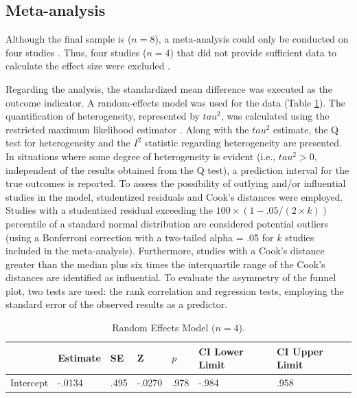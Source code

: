 \documentclass[english]{textolivre}
\begin{document}
\subsection{Meta-analysis}
Although the final sample is ($n = 8$), a meta-analysis could only be conducted on four studies \cite{demirbilek2018, penalba2020, perezsuasnavas2022, salasrueda2019}. Thus, four studies ($n = 4$) that did not provide sufficient data to calculate the effect size were excluded \cite{alexiou2020, almarzouki2022, salasrueda2018, zulkifli2018}.

Regarding the analysis, the standardized mean difference was executed as the outcome indicator. A random-effects model was used for the data (Table \ref{tab-4}). The quantification of heterogeneity, represented by $tau^2$, was calculated using the restricted maximum likelihood estimator \cite{viechtbauer2005}. Along with the $tau^2$ estimate, the Q test for heterogeneity \cite{cochran1954} and the $I^2$ statistic regarding heterogeneity are presented. In situations where some degree of heterogeneity is evident (i.e., $tau^2 > 0$, independent of the results obtained from the Q test), a prediction interval for the true outcomes is reported. To assess the possibility of outlying and/or influential studies in the model, studentized residuals and Cook’s distances were employed. Studies with a studentized residual exceeding the $100 \times (1 - .05/(2 \times k))$ percentile of a standard normal distribution are considered potential outliers (using a Bonferroni correction with a two-tailed alpha = .05 for $k$ studies included in the meta-analysis). Furthermore, studies with a Cook’s distance greater than the median plus six times the interquartile range of the Cook’s distances are identified as influential. To evaluate the asymmetry of the funnel plot, two tests are used: the rank correlation and regression tests, employing the standard error of the observed results as a predictor.
\newpage

\begin{table}[h!]
\centering
\caption{Random Effects Model ($n = 4$).}\label{tab-4}

\begin{tabular}{p{} p{} p{} p{} p{} p{} p{}}
\toprule
 & Estimate & SE & Z & $p$ & CI Lower Limit & CI Upper Limit \\
\midrule
Intercept & -.0134 & .495 & -.0270 & .978 & -.984 & .958 \\
\bottomrule
\end{tabular}
\end{table}
\end{document}
